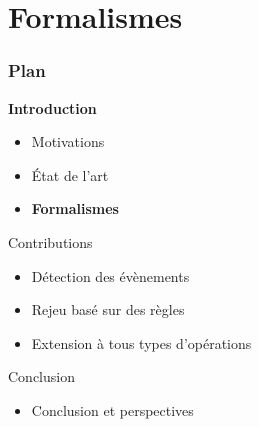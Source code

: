 \documentclass[aspectratio=1610]{beamer}
\begin{document}
\section{Formalismes}
\begin{frame}
	\frametitle{Plan}
	\centering
	\begin{minipage}{\textwidth}
		\raggedright
		\begin{minipage}{.55\textwidth}
			\begin{mytocblock}{\textbf{Introduction}}
				\begin{itemize}
					\item[] Motivations
					\item[] État de l'art
					\item[]\textbf{Formalismes}
				\end{itemize}
			\end{mytocblock}
		\end{minipage}

		\vspace{1em}

		\begin{minipage}{.55\textwidth}
			\begin{mytocblock}{Contributions}
				\begin{itemize}
					\item[] Détection des évènements
					\item[] Rejeu basé sur des règles
					\item[] Extension à tous types d'opérations
				\end{itemize}
			\end{mytocblock}
		\end{minipage}

		\vspace{1em}

		\begin{minipage}{.55\textwidth}
			\begin{mytocblock}{Conclusion}
				\begin{itemize}
					\item[] Conclusion et perspectives
				\end{itemize}
			\end{mytocblock}
		\end{minipage}
	\end{minipage}
\end{frame}

\end{document}
